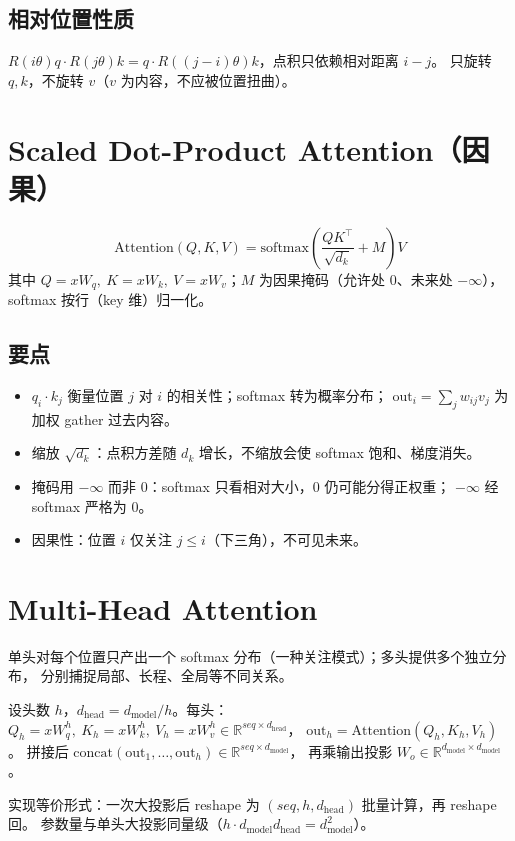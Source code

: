 \documentclass[12pt]{ctexart}
\begin{document}
\subsection{相对位置性质}
$R(i\theta)q \cdot R(j\theta)k = q \cdot R((j-i)\theta)k$，点积只依赖相对距离 $i-j$。
只旋转 $q,k$，不旋转 $v$（$v$ 为内容，不应被位置扭曲）。

\section{Scaled Dot-Product Attention（因果）}

\[
\text{Attention}(Q,K,V)=\text{softmax}\!\left(\frac{QK^{\top}}{\sqrt{d_k}}+M\right)V
\]
其中 $Q=xW_q,\ K=xW_k,\ V=xW_v$；$M$ 为因果掩码（允许处 $0$、未来处 $-\infty$），
softmax 按行（key 维）归一化。

\subsection{要点}
\begin{itemize}
  \item $q_i\cdot k_j$ 衡量位置 $j$ 对 $i$ 的相关性；softmax 转为概率分布；
        $\text{out}_i=\sum_j w_{ij}v_j$ 为加权 gather 过去内容。
  \item 缩放 $\sqrt{d_k}$：点积方差随 $d_k$ 增长，不缩放会使 softmax 饱和、梯度消失。
  \item 掩码用 $-\infty$ 而非 $0$：softmax 只看相对大小，$0$ 仍可能分得正权重；
        $-\infty$ 经 softmax 严格为 $0$。
  \item 因果性：位置 $i$ 仅关注 $j\le i$（下三角），不可见未来。
\end{itemize}

\section{Multi-Head Attention}

单头对每个位置只产出一个 softmax 分布（一种关注模式）；多头提供多个独立分布，
分别捕捉局部、长程、全局等不同关系。

设头数 $h$，$d_{\text{head}}=d_{\text{model}}/h$。每头：
$Q_h=xW_q^h,\ K_h=xW_k^h,\ V_h=xW_v^h \in \mathbb{R}^{seq\times d_{\text{head}}}$，
$\text{out}_h=\text{Attention}(Q_h,K_h,V_h)$。
拼接后 $\text{concat}(\text{out}_1,\dots,\text{out}_h)\in\mathbb{R}^{seq\times d_{\text{model}}}$，
再乘输出投影 $W_o\in\mathbb{R}^{d_{\text{model}}\times d_{\text{model}}}$。

实现等价形式：一次大投影后 reshape 为 $(seq,h,d_{\text{head}})$ 批量计算，再 reshape 回。
参数量与单头大投影同量级（$h\cdot d_{\text{model}}d_{\text{head}}=d_{\text{model}}^2$）。
\end{document}
